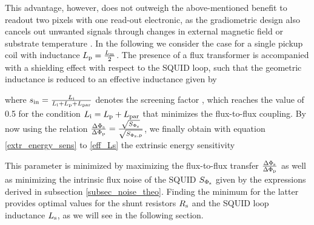 
This advantage, however, does not outweigh the above-mentioned benefit to readout two pixels with one read-out electronic, as the gradiometric design also cancels out unwanted signals through changes in external magnetic field or substrate temperature \cite{Mantegazzini2021}. In the following we consider the case for a single pickup coil with inductance $L_{\rm p}=\frac{L_{\rm m}}{2}$. The presence of a flux transformer is accompanied with a shielding effect with respect to the SQUID loop, such that the geometric inductance is reduced to an effective inductance given by \cite{Gross2016} 


where $s_{\rm in}=\frac{L_{\rm i}}{L_{\rm i} + L_{\rm p} + L_{\rm par}}$ denotes the screening factor \cite{Clarke2004}, which reaches the value of 0.5 for the condition $L_{\rm i}=L_{\rm p}+L_{\rm par}$ that minimizes the flux-to-flux coupling. By now using the relation $\frac{\Delta\Phi_{\rm s}}{\Delta\Phi_{\rm p}}=\frac{\sqrt{S_{\rm \Phi_s}}}{\sqrt{S_{\rm \Phi_s,p}}}$, we finally obtain with equation \ref{extr_energy_sens} to \ref{eff_Ls} the extrinsic energy sensitivity \cite{Knuutila1988}


This parameter is minimized by maximizing the flux-to-flux transfer $\frac{\Delta\Phi_{\rm s}}{\Delta\Phi_{\rm p}}$ as well as minimizing the intrinsic flux noise of the SQUID $S_{\rm \Phi_s}$ given by the expressions derived in subsection \ref{subsec_noise_theo}. Finding the minimum for the latter provides optimal values for the shunt resistors $R_{\rm s}$ and the SQUID loop inductance $L_{\rm s}$, as we will see in the following section.  


